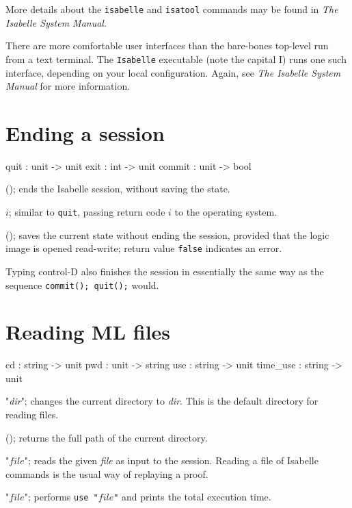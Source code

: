 \medskip More details about the \texttt{isabelle} and \texttt{isatool}
commands may be found in \emph{The Isabelle System Manual}.

\medskip There are more comfortable user interfaces than the bare-bones \ML{}
top-level run from a text terminal.  The \texttt{Isabelle} executable (note
the capital I) runs one such interface, depending on your local configuration.
Again, see \emph{The Isabelle System Manual} for more information.


\section{Ending a session}
\begin{ttbox} 
quit    : unit -> unit
exit    : int -> unit
commit  : unit -> bool
\end{ttbox}
\begin{ttdescription}
\item[\ttindexbold{quit}();] ends the Isabelle session, without saving
  the state.
  
\item[\ttindexbold{exit} \(i\);] similar to {\tt quit}, passing return
  code \(i\) to the operating system.

\item[\ttindexbold{commit}();] saves the current state without ending
  the session, provided that the logic image is opened read-write;
  return value {\tt false} indicates an error.
\end{ttdescription}

Typing control-D also finishes the session in essentially the same way
as the sequence {\tt commit(); quit();} would.


\section{Reading ML files}
\begin{ttbox} 
cd              : string -> unit
pwd             : unit -> string
use             : string -> unit
time_use        : string -> unit
\end{ttbox}
\begin{ttdescription}
\item[\ttindexbold{cd} "{\it dir}";] changes the current directory to
  {\it dir}.  This is the default directory for reading files.
  
\item[\ttindexbold{pwd}();] returns the full path of the current
  directory.

\item[\ttindexbold{use} "$file$";]  
reads the given {\it file} as input to the \ML{} session.  Reading a file
of Isabelle commands is the usual way of replaying a proof.

\item[\ttindexbold{time_use} "$file$";]  
performs {\tt use~"$file$"} and prints the total execution time.
\end{ttdescription}

